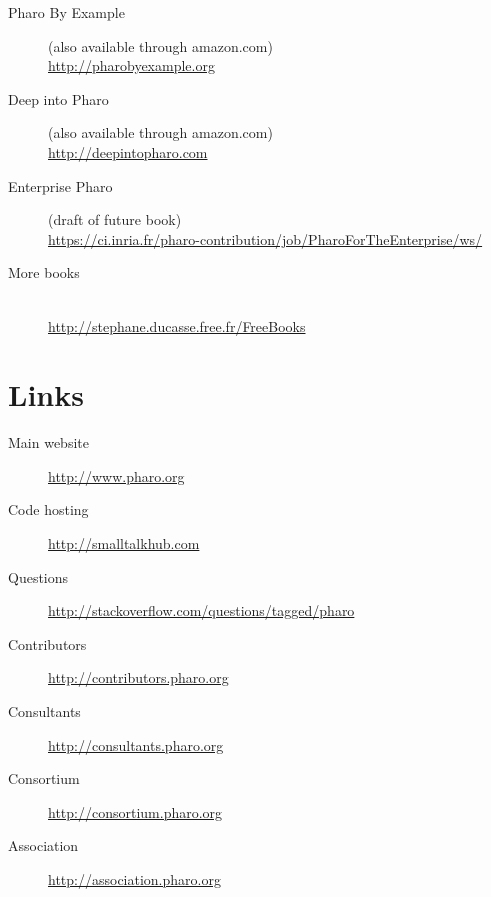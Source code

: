 \documentclass[notumble]{leaflet}
\begin{document}
\begin{description}
\item[Pharo By Example]
  (also available through amazon.com)\\
  \url{http://pharobyexample.org}
\item[Deep into Pharo]
  (also available through amazon.com)\\
  \url{http://deepintopharo.com}
\item[Enterprise Pharo]
  (draft of future book)\\
  \url{https://ci.inria.fr/pharo-contribution/job/PharoForTheEnterprise/ws/}
\item[More books]~\\
    \url{http://stephane.ducasse.free.fr/FreeBooks}
\end{description}



\section{Links}

\begin{description}
 \item[Main website] \url{http://www.pharo.org}
 \item[Code hosting] \url{http://smalltalkhub.com}
 \item[Questions]    \url{http://stackoverflow.com/questions/tagged/pharo}
 \item[Contributors] \url{http://contributors.pharo.org}
 \item[Consultants]  \url{http://consultants.pharo.org}
 \item[Consortium]   \url{http://consortium.pharo.org}
 \item[Association]  \url{http://association.pharo.org}
\end{description}

\vfill{}
\end{document}
